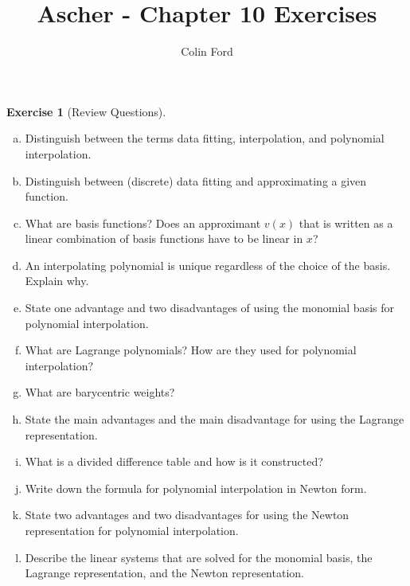 \documentclass[12pt,a4]{article}
\author{Colin Ford}
\title{Ascher - Chapter 10 Exercises}
\date{}
\theoremstyle{definition}
\newtheorem{exercise}{Exercise}
\begin{document}
\maketitle

\begin{exercise}[Review Questions]
	\begin{enumerate}[(a)]
		\item Distinguish between the terms data fitting, interpolation, and polynomial interpolation.
		
		\item Distinguish between (discrete) data fitting and approximating a given function.
		
		\item What are basis functions? Does an approximant $v(x)$ that is written as a linear combination of basis functions have to be linear in $x$?
		
		\item An interpolating polynomial is unique regardless of the choice of the basis. Explain why.
		
		\item State one advantage and two disadvantages of using the monomial basis for polynomial interpolation.
		
		\item What are Lagrange polynomials? How are they used for polynomial interpolation?
		
		\item What are barycentric weights?
		
		\item State the main advantages and the main disadvantage for using the Lagrange representation.

		\item What is a divided difference table and how is it constructed?
		
		\item Write down the formula for polynomial interpolation in Newton form.
		
		\item State two advantages and two disadvantages for using the Newton representation for polynomial interpolation.
		
		\item Describe the linear systems that are solved for the monomial basis, the Lagrange representation, and the Newton representation.
		

\end{enumerate}
\end{exercise}
\end{document}
